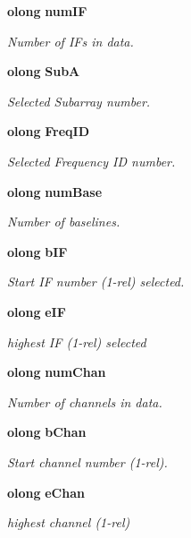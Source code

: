 \begin{CompactItemize}
{\bf olong} {\bf num\-IF}
\begin{CompactList}\small\item\em Number of IFs in data. \item\end{CompactList}\item 
{\bf olong} {\bf Sub\-A}
\begin{CompactList}\small\item\em Selected Subarray number. \item\end{CompactList}\item 
{\bf olong} {\bf Freq\-ID}
\begin{CompactList}\small\item\em Selected Frequency ID number. \item\end{CompactList}\item 
{\bf olong} {\bf num\-Base}
\begin{CompactList}\small\item\em Number of baselines. \item\end{CompactList}\item 
{\bf olong} {\bf b\-IF}
\begin{CompactList}\small\item\em Start IF number (1-rel) selected. \item\end{CompactList}\item 
{\bf olong} {\bf e\-IF}
\begin{CompactList}\small\item\em highest IF (1-rel) selected \item\end{CompactList}\item 
{\bf olong} {\bf num\-Chan}
\begin{CompactList}\small\item\em Number of channels in data. \item\end{CompactList}\item 
{\bf olong} {\bf b\-Chan}
\begin{CompactList}\small\item\em Start channel number (1-rel). \item\end{CompactList}\item 
{\bf olong} {\bf e\-Chan}
\begin{CompactList}\small\item\em highest channel (1-rel) \item\end{CompactList}\item 

\end{CompactItemize}
